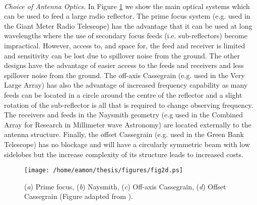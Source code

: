 \\
\textit{Choice of Antenna Optics.} In Figure \ref{fig2d} we show the main optical systems which can be used to feed a large radio reflector. The prime focus system (e.g. used in the Giant Meter Radio Telescope) has the advantage that it can be used at long wavelengths where the use of secondary focus feeds (i.e. sub-reflectors) become impractical. However, access to, and space for, the feed and receiver is limited and sensitivity can be lost due to spillover noise from the ground. The other designs have the advantage of easier access to the feeds and receivers and less spillover noise from the ground. The off-axis Cassegrain (e.g. used in the Very Large Array) has also the advantage of increased frequency capability as many feeds can be located in a circle around the centre of the reflector and a slight rotation of the sub-reflector is all that is required to change observing frequency. The receivers and feeds in the Naysmith geometry (e.g used in the Combined Array for Research in Millimeter wave Astronomy) are located externally to the antenna structure. Finally, the offset Cassegrain (e.g. used in the Green Bank Telescope) has no blockage and will have a circularly symmetric beam with low sidelobes but the increase complexity of its structure leads to increased costs. 

\begin{figure}[hbt!]
\centering 
          \texttt{[image: /home/eamon/thesis/figures/fig2d.ps]}
\caption[Common optical systems used for radio antennas.]{(\textit{a}) Prime focus, (\textit{b}) Naysmith, (\textit{c}) Off-axis Cassegrain, (\textit{d}) Offset Cassegrain (Figure adapted from \cite{taylor_1999}).}
\label{fig2d}
\end{figure}

